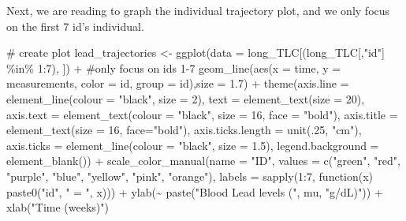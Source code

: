 \documentclass[
  letterpaper,
  DIV=11,
  numbers=noendperiod]{scrreprt}
\newenvironment{Shaded}{\begin{snugshade}}{\end{snugshade}}
\newcommand{\AttributeTok}[1]{\textcolor[rgb]{0.40,0.45,0.13}{#1}}
\newcommand{\CommentTok}[1]{\textcolor[rgb]{0.37,0.37,0.37}{#1}}
\newcommand{\ControlFlowTok}[1]{\textcolor[rgb]{0.00,0.23,0.31}{#1}}
\newcommand{\DecValTok}[1]{\textcolor[rgb]{0.68,0.00,0.00}{#1}}
\newcommand{\FloatTok}[1]{\textcolor[rgb]{0.68,0.00,0.00}{#1}}
\newcommand{\FunctionTok}[1]{\textcolor[rgb]{0.28,0.35,0.67}{#1}}
\newcommand{\NormalTok}[1]{\textcolor[rgb]{0.00,0.23,0.31}{#1}}
\newcommand{\OtherTok}[1]{\textcolor[rgb]{0.00,0.23,0.31}{#1}}
\newcommand{\SpecialCharTok}[1]{\textcolor[rgb]{0.37,0.37,0.37}{#1}}
\newcommand{\StringTok}[1]{\textcolor[rgb]{0.13,0.47,0.30}{#1}}
\begin{document}
Next, we are reading to graph the individual trajectory plot, and we
only focus on the first 7 id's individual.

\begin{Shaded}
\begin{Highlighting}[]
\CommentTok{\# create plot}
\NormalTok{lead\_trajectories }\OtherTok{\textless{}{-}} \FunctionTok{ggplot}\NormalTok{(}\AttributeTok{data =}\NormalTok{ long\_TLC[(long\_TLC[,}\StringTok{"id"}\NormalTok{] }\SpecialCharTok{\%in\%} \DecValTok{1}\SpecialCharTok{:}\DecValTok{7}\NormalTok{), ]) }\SpecialCharTok{+} \CommentTok{\#only focus on id\textquotesingle{}s 1{-}7}
  \FunctionTok{geom\_line}\NormalTok{(}\FunctionTok{aes}\NormalTok{(}\AttributeTok{x =}\NormalTok{ time, }\AttributeTok{y =}\NormalTok{ measurements, }\AttributeTok{color =}\NormalTok{ id, }\AttributeTok{group =}\NormalTok{ id),}\AttributeTok{size =} \FloatTok{1.7}\NormalTok{) }\SpecialCharTok{+} 
  \FunctionTok{theme}\NormalTok{(}\AttributeTok{axis.line =} \FunctionTok{element\_line}\NormalTok{(}\AttributeTok{colour =} \StringTok{"black"}\NormalTok{, }\AttributeTok{size =} \DecValTok{2}\NormalTok{),}
        \AttributeTok{text =} \FunctionTok{element\_text}\NormalTok{(}\AttributeTok{size =} \DecValTok{20}\NormalTok{),}
        \AttributeTok{axis.text =} \FunctionTok{element\_text}\NormalTok{(}\AttributeTok{colour =} \StringTok{"black"}\NormalTok{, }\AttributeTok{size =} \DecValTok{16}\NormalTok{, }\AttributeTok{face =} \StringTok{"bold"}\NormalTok{),}
        \AttributeTok{axis.title =} \FunctionTok{element\_text}\NormalTok{(}\AttributeTok{size =} \DecValTok{16}\NormalTok{, }\AttributeTok{face=}\StringTok{"bold"}\NormalTok{),}
        \AttributeTok{axis.ticks.length =} \FunctionTok{unit}\NormalTok{(.}\DecValTok{25}\NormalTok{, }\StringTok{"cm"}\NormalTok{),}
        \AttributeTok{axis.ticks =} \FunctionTok{element\_line}\NormalTok{(}\AttributeTok{colour =} \StringTok{"black"}\NormalTok{, }\AttributeTok{size =} \FloatTok{1.5}\NormalTok{),}
        \AttributeTok{legend.background =} \FunctionTok{element\_blank}\NormalTok{()) }\SpecialCharTok{+}
  \FunctionTok{scale\_color\_manual}\NormalTok{(}\AttributeTok{name =} \StringTok{"ID"}\NormalTok{, }\AttributeTok{values =} \FunctionTok{c}\NormalTok{(}\StringTok{"green"}\NormalTok{, }\StringTok{"red"}\NormalTok{, }\StringTok{"purple"}\NormalTok{, }\StringTok{"blue"}\NormalTok{,}
                                             \StringTok{"yellow"}\NormalTok{, }\StringTok{"pink"}\NormalTok{, }\StringTok{"orange"}\NormalTok{),}
                     \AttributeTok{labels =} \FunctionTok{sapply}\NormalTok{(}\DecValTok{1}\SpecialCharTok{:}\DecValTok{7}\NormalTok{, }\ControlFlowTok{function}\NormalTok{(x) }\FunctionTok{paste0}\NormalTok{(}\StringTok{"id"}\NormalTok{, }\StringTok{" = "}\NormalTok{, x))) }\SpecialCharTok{+}
  \FunctionTok{ylab}\NormalTok{(}\SpecialCharTok{\textasciitilde{}} \FunctionTok{paste}\NormalTok{(}\StringTok{"Blood Lead levels ("}\NormalTok{, mu, }\StringTok{"g/dL)"}\NormalTok{)) }\SpecialCharTok{+}
  \FunctionTok{xlab}\NormalTok{(}\StringTok{"Time (weeks)"}\NormalTok{)}


\end{Highlighting}
\end{Shaded}
\end{document}
